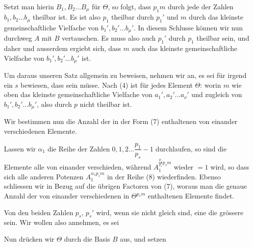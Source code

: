 
Setzt man hierin $B_1, B_2 \ldots B_\mu$ für $\Theta$, so folgt, dass $p_1 m$
durch jede der Zahlen $b_1, b_2 \ldots b_\mu$ theilbar ist. Es ist also $p_1$
theilbar durch $p_1'$ und $m$ durch das kleinste gemeinschaftliche
Vielfache von $b_1', b_2' \ldots b_\mu'$. In diesem Schlusse können wir nun
durchweg $A$ mit $B$ vertauschen. Es muss also auch $p_1'$ durch $p_1$
theilbar sein, und daher
und ausserdem ergiebt sich, dass $m$ auch das kleinste gemeinschaftliche
 Vielfache von $b_1', b_2' \ldots b_\mu'$ ist.

Um daraus unseren Satz allgemein zu beweisen, nehmen wir an,
es sei für irgend ein $s$ bewiesen, dass
sein müsse. Nach (4) ist für jedes Element $\Theta$:
worin $m$ wie oben das kleinste gemeinschaftliche Vielfache von
$a_1', a_2' \ldots a_\nu'$ und zugleich von $b_1', b_2' \ldots b_\mu'$, also durch $p$ nicht
theilbar ist.

Wir bestimmen nun die Anzahl der in der Form (7) enthaltenen
 von einander verschiedenen Elemente.

Lassen wir $\alpha_1$ die Reihe der Zahlen $0, 1, 2 \ldots \dfrac{p_1}{p_s} - 1$
durchlaufen, so sind die Elemente
alle von einander verschieden, während $A_1^{\frac{p_1}{p_s} p_s m}$ wieder $= 1$
wird, so dass sich alle anderen Potenzen $A_1^{\alpha_1 p_s m}$ in der Reihe (8)
wiederfinden. Ebenso schliessen wir in Bezug auf die übrigen
Factoren von (7), woraus man die genaue Anzahl der von einander
 verschiedenen in $\Theta^{p_s m}$ enthaltenen Elemente
findet.

Von den beiden Zahlen $p_s$, $p_s'$ wird, wenn sie nicht gleich
sind, eine die grössere sein. Wir wollen also annehmen, es sei

Nun drücken wir $\Theta$ durch die Basis $B$ aus, und setzen
